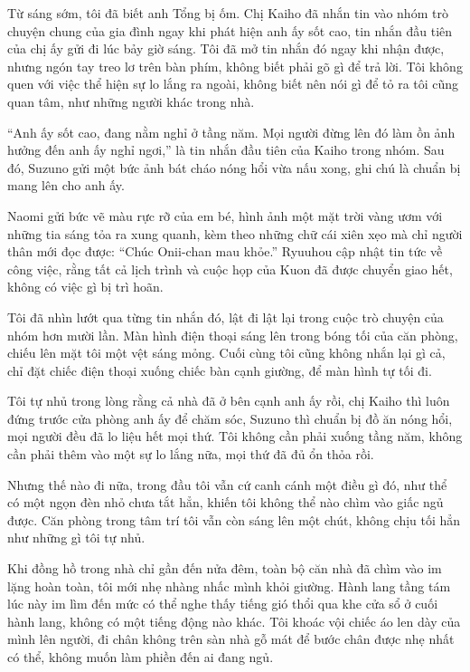 \documentclass[../main.tex]{subfiles}
\begin{document}
Từ sáng sớm, tôi đã biết anh Tổng bị ốm. Chị Kaiho đã nhắn tin vào nhóm trò chuyện chung của gia đình ngay khi phát hiện anh ấy sốt cao, tin nhắn đầu tiên của chị ấy gửi đi lúc bảy giờ sáng. Tôi đã mở tin nhắn đó ngay khi nhận được, nhưng ngón tay treo lơ trên bàn phím, không biết phải gõ gì để trả lời. Tôi không quen với việc thể hiện sự lo lắng ra ngoài, không biết nên nói gì để tỏ ra tôi cũng quan tâm, như những người khác trong nhà.

``Anh ấy sốt cao, đang nằm nghỉ ở tầng năm. Mọi người đừng lên đó làm ồn ảnh hưởng đến anh ấy nghỉ ngơi,'' là tin nhắn đầu tiên của Kaiho trong nhóm. Sau đó, Suzuno gửi một bức ảnh bát cháo nóng hổi vừa nấu xong, ghi chú là chuẩn bị mang lên cho anh ấy.

Naomi gửi bức vẽ màu rực rỡ của em bé, hình ảnh một mặt trời vàng ươm với những tia sáng tỏa ra xung quanh, kèm theo những chữ cái xiên xẹo mà chỉ người thân mới đọc được: ``Chúc Onii-chan mau khỏe.'' Ryuuhou cập nhật tin tức về công việc, rằng tất cả lịch trình và cuộc họp của Kuon đã được chuyển giao hết, không có việc gì bị trì hoãn.

Tôi đã nhìn lướt qua từng tin nhắn đó, lật đi lật lại trong cuộc trò chuyện của nhóm hơn mười lần. Màn hình điện thoại sáng lên trong bóng tối của căn phòng, chiếu lên mặt tôi một vệt sáng mỏng. Cuối cùng tôi cũng không nhắn lại gì cả, chỉ đặt chiếc điện thoại xuống chiếc bàn cạnh giường, để màn hình tự tối đi. 

Tôi tự nhủ trong lòng rằng cả nhà đã ở bên cạnh anh ấy rồi, chị Kaiho thì luôn đứng trước cửa phòng anh ấy để chăm sóc, Suzuno thì chuẩn bị đồ ăn nóng hổi, mọi người đều đã lo liệu hết mọi thứ. Tôi không cần phải xuống tầng năm, không cần phải thêm vào một sự lo lắng nữa, mọi thứ đã đủ ổn thỏa rồi.

Nhưng thế nào đi nữa, trong đầu tôi vẫn cứ canh cánh một điều gì đó, như thể có một ngọn đèn nhỏ chưa tắt hẳn, khiến tôi không thể nào chìm vào giấc ngủ được. Căn phòng trong tâm trí tôi vẫn còn sáng lên một chút, không chịu tối hẳn như những gì tôi tự nhủ.

\ct

Khi đồng hồ trong nhà chỉ gần đến nửa đêm, toàn bộ căn nhà đã chìm vào im lặng hoàn toàn, tôi mới nhẹ nhàng nhấc mình khỏi giường. Hành lang tầng tám lúc này im lìm đến mức có thể nghe thấy tiếng gió thổi qua khe cửa sổ ở cuối hành lang, không có một tiếng động nào khác. Tôi khoác vội chiếc áo len dày của mình lên người, đi chân không trên sàn nhà gỗ mát để bước chân được nhẹ nhất có thể, không muốn làm phiền đến ai đang ngủ.
\end{document}
